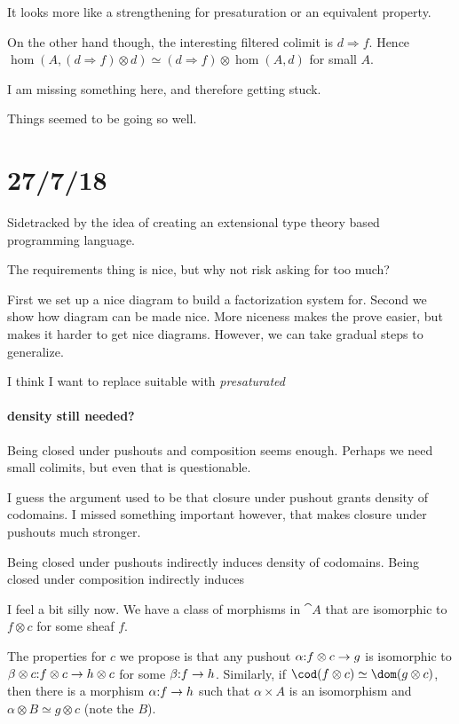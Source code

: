 \documentclass[csh.tex]{subfiles}
\begin{document}
It looks more like a strengthening for presaturation or an equivalent property.

On the other hand though, the interesting filtered colimit is $d\Rightarrow f$. Hence $\hom(A,(d\Rightarrow f)\otimes d) \simeq (d\Rightarrow f)\otimes \hom(A,d)$ for small $A$. 

I am missing something here, and therefore getting stuck.

Things seemed to be going so well.



\section{27/7/18}
Sidetracked by the idea of creating an extensional type theory based programming language.


The requirements thing is nice, but why not risk asking for too much?

First we set up a nice diagram to build a factorization system for. Second we show how diagram can be made nice. More niceness makes the prove easier, but makes it harder to get nice diagrams. However, we can take gradual steps to generalize.

I think I want to replace suitable with \emph{presaturated}


\paragraph{density still needed?}
Being closed under pushouts and composition seems enough. Perhaps we need small colimits, but even that is questionable.

I guess the argument used to be that closure under pushout grants density of codomains. I missed something important however, that makes closure under pushouts much stronger.

Being closed under pushouts indirectly induces density of codomains.
Being closed under composition indirectly induces 

I feel a bit silly now. We have a class of morphisms in $\cat A$ that are isomorphic to $f\otimes c$ for some sheaf $f$. 

The properties for $c$ we propose is that any pushout $\alpha\mathord : f\otimes c\to g$ is isomorphic to $\beta\otimes c\mathord : f\otimes c \to h\otimes c$ for some $\beta\mathord : f\to h$. Similarly, if $\cod(f\otimes c) \simeq \dom(g\otimes c)$, then there is a morphism $\alpha\mathord : f\to h$ such that $\alpha\times A$ is an isomorphism and $\alpha\otimes B\simeq g\otimes c$ (note the $B$).
\end{document}
